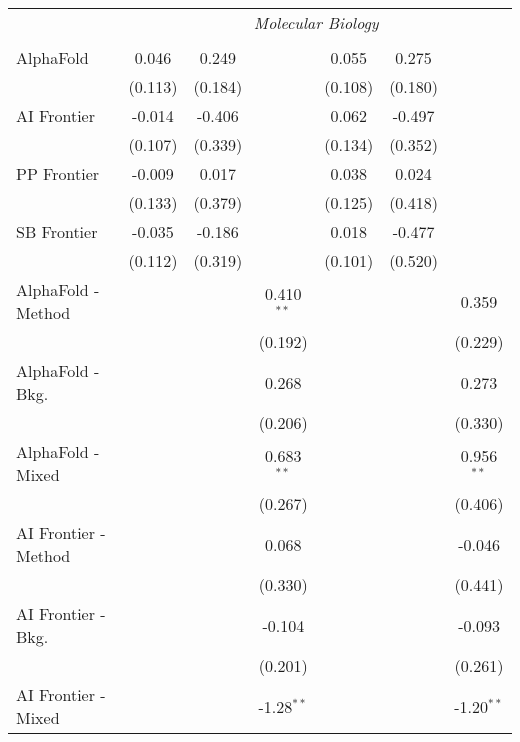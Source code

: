 \begin{tabular}{lcccccc}
 & \multicolumn{6}{c}{\textit{Molecular Biology}} \\ \\
   AlphaFold            & 0.046   & 0.249   &               & 0.055   & 0.275   &   \\   
                        & (0.113) & (0.184) &               & (0.108) & (0.180) &   \\   
   AI Frontier          & -0.014  & -0.406  &               & 0.062   & -0.497  &   \\   
                        & (0.107) & (0.339) &               & (0.134) & (0.352) &   \\   
   PP Frontier          & -0.009  & 0.017   &               & 0.038   & 0.024   &   \\   
                        & (0.133) & (0.379) &               & (0.125) & (0.418) &   \\   
   SB Frontier          & -0.035  & -0.186  &               & 0.018   & -0.477  &   \\   
                        & (0.112) & (0.319) &               & (0.101) & (0.520) &   \\   
   AlphaFold - Method   &         &         & 0.410$^{**}$  &         &         & 0.359\\   
                        &         &         & (0.192)       &         &         & (0.229)\\   
   AlphaFold - Bkg.     &         &         & 0.268         &         &         & 0.273\\   
                        &         &         & (0.206)       &         &         & (0.330)\\   
   AlphaFold - Mixed    &         &         & 0.683$^{**}$  &         &         & 0.956$^{**}$\\   
                        &         &         & (0.267)       &         &         & (0.406)\\   
   AI Frontier - Method &         &         & 0.068         &         &         & -0.046\\   
                        &         &         & (0.330)       &         &         & (0.441)\\   
   AI Frontier - Bkg.   &         &         & -0.104        &         &         & -0.093\\   
                        &         &         & (0.201)       &         &         & (0.261)\\   
   AI Frontier - Mixed  &         &         & -1.28$^{**}$  &         &         & -1.20$^{**}$\\   

\end{tabular}
